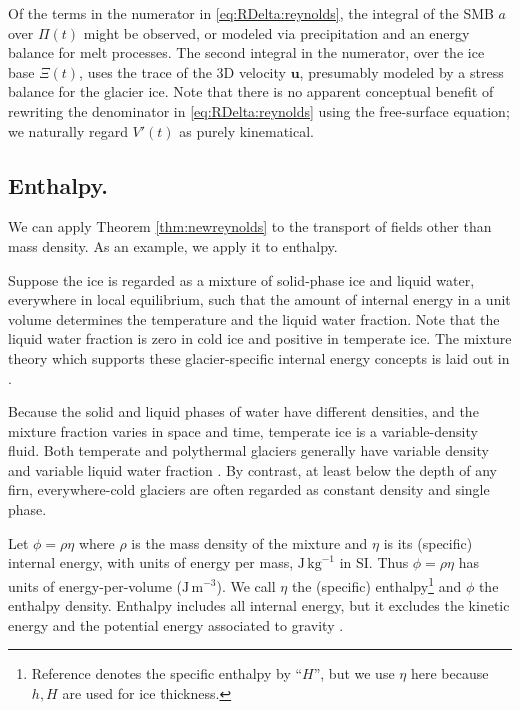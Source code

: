 \documentclass[11pt]{amsart}
\theoremstyle{definition}
\newcommand{\bu}{\mathbf{u}}
\begin{document}
Of the terms in the numerator in \eqref{eq:RDelta:reynolds}, the integral of the SMB $a$ over $\Pi(t)$ might be observed, or modeled via precipitation and an energy balance for melt processes.  The second integral in the numerator, over the ice base $\Xi(t)$, uses the trace of the 3D velocity $\bu$, presumably modeled by a stress balance for the glacier ice.  Note that there is no apparent conceptual benefit of rewriting the denominator in \eqref{eq:RDelta:reynolds} using the free-surface equation; we naturally regard $V'(t)$ as purely kinematical.

\subsection{Enthalpy.}  \label{ssec:enthalpy}  We can apply Theorem \ref{thm:newreynolds} to the transport of fields other than mass density.  As an example, we apply it to enthalpy.

Suppose the ice is regarded as a mixture of solid-phase ice and liquid water, everywhere in local equilibrium, such that the amount of internal energy in a unit volume determines the temperature and the liquid water fraction.  Note that the liquid water fraction is zero in cold ice and positive in temperate ice.  The mixture theory which supports these glacier-specific internal energy concepts is laid out in \cite{Aschwandenetal2012}.

Because the solid and liquid phases of water have different densities, and the mixture fraction varies in space and time, temperate ice is a variable-density fluid.  Both temperate and polythermal glaciers generally have variable density and variable liquid water fraction \cite{GreveBlatter2009}.  By contrast, at least below the depth of any firn, everywhere-cold glaciers are often regarded as constant density and single phase.

Let $\phi=\rho \eta$ where $\rho$ is the mass density of the mixture and $\eta$ is its (specific) internal energy, with units of energy per mass, $\text{J}\,\text{kg}^{-1}$ in SI.  Thus $\phi=\rho\eta$ has units of energy-per-volume ($\text{J}\,\text{m}^{-3}$).  We call $\eta$ the (specific) enthalpy\footnote{Reference \cite{Aschwandenetal2012} denotes the specific enthalpy by ``$H$'', but we use $\eta$ here because $h,H$ are used for ice thickness.} and $\phi$ the enthalpy density.  Enthalpy includes all internal energy, but it excludes the kinetic energy and the potential energy associated to gravity \cite{Aschwandenetal2012}.
\end{document}
